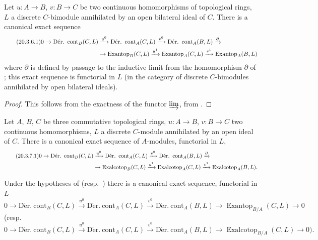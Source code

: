 \begin{proposition}[20.3.6]
\label{0.20.3.6}
Let $u:A\to B$, $v:B\to C$ be two continuous homomorphisms of topological rings, $L$ a discrete $C$-bimodule annihilated by an open bilateral ideal of $C$.
There is a canonical exact sequence
\begin{align}
\tag{20.3.6.1}
  \label{0.20.3.6.1}
  0\to\operatorname{D\acute{e}r.\ cont}_B(C,L)&\xrightarrow{u^0}\operatorname{D\acute{e}r.\ cont}_A(C,L)\xrightarrow{v^0}\operatorname{D\acute{e}r.\ cont}_A(B,L)\xrightarrow{\partial} \\
  &\to\operatorname{Exantop}_B(C,L)\xrightarrow{u^1}\operatorname{Exantop}_A(C,L)\xrightarrow{v^1}\operatorname{Exantop}_A(B,L) \notag
\end{align}
where $\partial$ is defined by passage to the inductive limit from the homomorphism $\partial$ of ; this exact sequence is functorial in $L$ (in the category of discrete $C$-bimodules annihilated by open bilateral ideals).
\end{proposition}

\begin{proof}
This follows from the exactness of the functor $\varinjlim$, from .
\end{proof}

\begin{corollary}[20.3.7]
\label{0.20.3.7}
Let $A$, $B$, $C$ be three commutative topological rings, $u:A\to B$, $v:B\to C$ two continuous homomorphisms, $L$ a discrete $C$-module annihilated by an open ideal of $C$.
There is a canonical exact sequence of $A$-modules, functorial in $L$,
\begin{align}
\tag{20.3.7.1}
  \label{0.20.3.7.1}
  0\to\operatorname{D\acute{e}r.\ cont}_B(C,L)&\xrightarrow{u^0}\operatorname{D\acute{e}r.\ cont}_A(C,L)\xrightarrow{v^0}\operatorname{D\acute{e}r.\ cont}_A(B,L)\xrightarrow{\partial} \\
  &\to\operatorname{Exalcotop}_B(C,L)\xrightarrow{u^1}\operatorname{Exalcotop}_A(C,L)\xrightarrow{v^1}\operatorname{Exalcotop}_A(B,L). \notag
\end{align}
\end{corollary}

\begin{corollary}[20.3.8]
\label{0.20.3.8}
Under the hypotheses of  \textup{(}resp.\ \textup{)} there is a canonical exact sequence, functorial in $L$
\begin{equation}
\tag{20.3.8.1}
  \label{0.20.3.8.1}
  0\to\operatorname{D\acute{e}r.\ cont}_B(C,L)\xrightarrow{u^0}\operatorname{D\acute{e}r.\ cont}_A(C,L)\xrightarrow{v^0}\operatorname{D\acute{e}r.\ cont}_A(B,L)\to\operatorname{Exantop}_{B/A}(C,L)\to 0
\end{equation}
\textup{(}resp.
\begin{equation}
\tag{20.3.8.2}
  \label{0.20.3.8.2}
  0\to\operatorname{D\acute{e}r.\ cont}_B(C,L)\xrightarrow{u^0}\operatorname{D\acute{e}r.\ cont}_A(C,L)\xrightarrow{v^0}\operatorname{D\acute{e}r.\ cont}_A(B,L)\to\operatorname{Exalcotop}_{B/A}(C,L)\to 0\text{).}
\end{equation}
\end{corollary}

